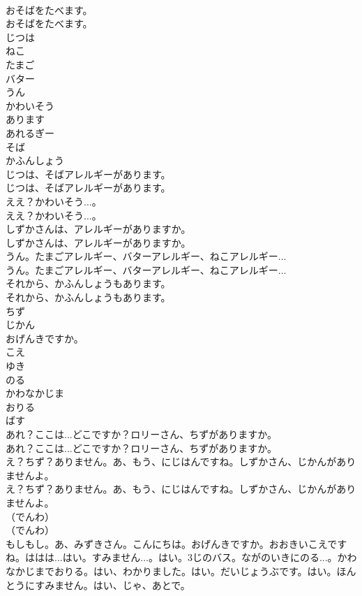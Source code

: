 \documentclass[8pt]{extreport}
\begin{document}
\begin{CJK}{UTF8}{min}
\\	おそばをたべます。	
\\	おそばをたべます。 
\\	じつは
\\	ねこ
\\	たまご
\\	バター
\\	うん
\\	かわいそう
\\	あります
\\	あれるぎー
\\	そば
\\	かふんしょう
\\	じつは、そばアレルギーがあります。	
\\	じつは、そばアレルギーがあります。 
\\	ええ？かわいそう...。	
\\	ええ？かわいそう...。 
\\	しずかさんは、アレルギーがありますか。	
\\	しずかさんは、アレルギーがありますか。 
\\	うん。たまごアレルギー、バターアレルギー、ねこアレルギー...	
\\	うん。たまごアレルギー、バターアレルギー、ねこアレルギー... 
\\	それから、かふんしょうもあります。	
\\	それから、かふんしょうもあります。 
\\	ちず
\\	じかん
\\	おげんきですか。
\\	こえ
\\	ゆき
\\	のる
\\	かわなかじま
\\	おりる
\\	ばす
\\	あれ？ここは...どこですか？ロリーさん、ちずがありますか。	
\\	あれ？ここは...どこですか？ロリーさん、ちずがありますか。 
\\	え？ちず？ありません。あ、もう、にじはんですね。しずかさん、じかんがありませんよ。	
\\	え？ちず？ありません。あ、もう、にじはんですね。しずかさん、じかんがありませんよ。 
\\	（でんわ）	
\\	（でんわ） 
\\	もしもし。あ、みずきさん。こんにちは。おげんきですか。おおきいこえですね。ははは...はい。すみません...。はい。3じのバス。ながのいきにのる...。かわなかじまでおりる。はい、わかりました。はい。だいじょうぶです。はい。ほんとうにすみません。はい、じゃ、あとで。	

\end{CJK}
\end{document}
